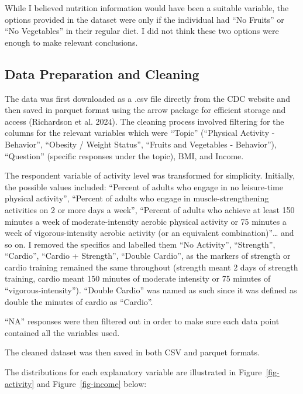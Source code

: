 \documentclass[
  letterpaper,
  DIV=11,
  numbers=noendperiod]{scrartcl}
\begin{document}
While I believed nutrition information would have been a suitable
variable, the options provided in the dataset were only if the
individual had ``No Fruits'' or ``No Vegetables'' in their regular diet.
I did not think these two options were enough to make relevant
conclusions.

\hypertarget{data-preparation-and-cleaning}{%
\subsection{Data Preparation and
Cleaning}\label{data-preparation-and-cleaning}}

The data was first downloaded as a .csv file directly from the CDC
website and then saved in parquet format using the arrow package for
efficient storage and access (Richardson et al. 2024). The cleaning
process involved filtering for the columns for the relevant variables
which were ``Topic'' (``Physical Activity - Behavior'', ``Obesity /
Weight Status'', ``Fruits and Vegetables - Behavior''), ``Question''
(specific responses under the topic), BMI, and Income.

The respondent variable of activity level was transformed for
simplicity. Initially, the possible values included: ``Percent of adults
who engage in no leisure-time physical activity'', ``Percent of adults
who engage in muscle-strengthening activities on 2 or more days a
week'', ``Percent of adults who achieve at least 150 minutes a week of
moderate-intensity aerobic physical activity or 75 minutes a week of
vigorous-intensity aerobic activity (or an equivalent
combination)''\ldots{} and so on. I removed the specifics and labelled
them ``No Activity'', ``Strength'', ``Cardio'', ``Cardio + Strength'',
``Double Cardio'', as the markers of strength or cardio training
remained the same throughout (strength meant 2 days of strength
training, cardio meant 150 minutes of moderate intensity or 75 minutes
of ``vigorous-intensity''). ``Double Cardio'' was named as such since it
was defined as double the minutes of cardio as ``Cardio''.

``NA'' responses were then filtered out in order to make sure each data
point contained all the variables used.

The cleaned dataset was then saved in both CSV and parquet formats.

The distributions for each explanatory variable are illustrated in
Figure~\ref{fig-activity} and Figure~\ref{fig-income} below:
\end{document}
